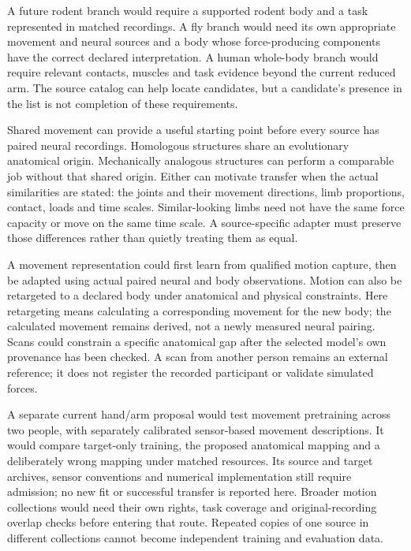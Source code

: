 A future rodent branch would require a supported rodent body and a task represented in matched recordings. A fly branch would need its own appropriate movement and neural sources and a body whose force-producing components have the correct declared interpretation. A human whole-body branch would require relevant contacts, muscles and task evidence beyond the current reduced arm. The source catalog can help locate candidates, but a candidate's presence in the list is not completion of these requirements.

Shared movement can provide a useful starting point before every source has
paired neural recordings. Homologous structures share an evolutionary anatomical
origin. Mechanically analogous structures can perform a comparable job without
that shared origin. Either can motivate transfer when the actual similarities
are stated: the joints and their movement directions, limb proportions, contact,
loads and time scales. Similar-looking limbs need not have the same force
capacity or move on the same time scale. A source-specific adapter must preserve
those differences rather than quietly treating them as equal.

A movement representation could first learn from qualified motion capture,
then be adapted using actual paired neural and body observations. Motion can
also be retargeted to a declared body under anatomical and physical constraints.
Here retargeting means calculating a corresponding movement for the new body;
the calculated movement remains derived, not a newly measured neural pairing.
Scans could constrain a specific anatomical gap after the selected model's own
provenance has been checked. A scan from another person remains an external
reference; it does not register the recorded participant or validate simulated
forces.

A separate current hand/arm proposal would test movement pretraining across
two people, with separately calibrated sensor-based movement descriptions. It
would compare target-only training, the proposed anatomical mapping and a
deliberately wrong mapping under matched resources. Its source and target
archives, sensor conventions and numerical implementation still require
admission; no new fit or successful transfer is reported here. Broader motion
collections would need their own rights, task coverage and original-recording
overlap checks before entering that route. Repeated copies of one source in
different collections cannot become independent training and evaluation data.

